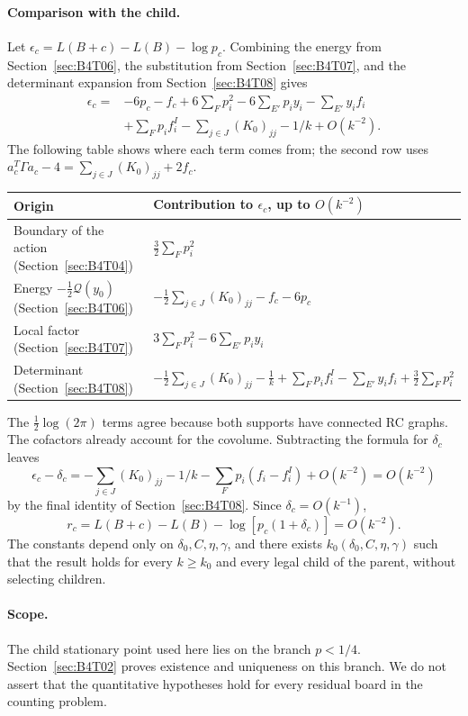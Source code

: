 \paragraph{Comparison with the child.}
Let $\epsilon_c=L(B+c)-L(B)-\log p_c$. Combining the energy from Section~\ref{sec:B4T06}, the substitution
from Section~\ref{sec:B4T07}, and the determinant expansion from Section~\ref{sec:B4T08} gives
\[
 \begin{aligned}
 \epsilon_c={}&-6p_c-f_c+6\sum_Fp_i^2-6\sum_{E'}p_iy_i
 -\sum_{E'}y_i f_i\\
 &+\sum_Fp_i f_i^I-\sum_{j\in J}(K_0)_{jj}-1/k+O(k^{-2}).
 \end{aligned}
\]
The following table shows where each term comes from; the second row uses
$a_c^T\Gamma a_c-4=\sum_{j\in J}(K_0)_{jj}+2f_c$.
\begin{center}
\renewcommand{\arraystretch}{1.3}
\begin{tabular}{@{}ll@{}}
\toprule
Origin & Contribution to $\epsilon_c$, up to $O(k^{-2})$\\
\midrule
Boundary of the action (Section~\ref{sec:B4T04}) & $\tfrac32\sum_Fp_i^2$\\
Energy $-\tfrac12\mathcal Q(y_0)$ (Section~\ref{sec:B4T06}) &
 $-\tfrac12\sum_{j\in J}(K_0)_{jj}-f_c-6p_c$\\
Local factor (Section~\ref{sec:B4T07}) & $3\sum_Fp_i^2-6\sum_{E'}p_iy_i$\\
Determinant (Section~\ref{sec:B4T08}) &
 $-\tfrac12\sum_{j\in J}(K_0)_{jj}-\tfrac1k+\sum_Fp_if_i^I-\sum_{E'}y_if_i+\tfrac32\sum_Fp_i^2$\\
\bottomrule
\end{tabular}
\end{center}
The $\tfrac12\log(2\pi)$ terms agree because both supports have connected RC graphs. The cofactors already
account for the covolume.
Subtracting the formula for $\delta_c$ leaves
\[
 \epsilon_c-\delta_c=-\sum_{j\in J}(K_0)_{jj}-1/k
                    -\sum_Fp_i(f_i-f_i^I)+O(k^{-2})=O(k^{-2})
\]
by the final identity of Section~\ref{sec:B4T08}.
Since $\delta_c=O(k^{-1})$,
\[
 \boxed{r_c=L(B+c)-L(B)-\log[p_c(1+\delta_c)]=O(k^{-2}).}
\]
The constants depend only on $\delta_0,C,\eta,\gamma$, and there exists $k_0(\delta_0,C,\eta,\gamma)$ such
that the result holds for every $k\ge k_0$ and every legal child of the parent, without selecting children.

\paragraph{Scope.}
The child stationary point used here lies on the branch $p<1/4$. Section~\ref{sec:B4T02} proves existence
and uniqueness on this branch.
We do not assert that the quantitative hypotheses hold for every residual board in the counting problem.
